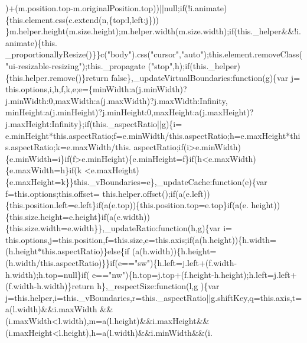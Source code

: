 \begin{DoxyCode}
      )+(m.position.top-m.originalPosition.top))||null;\textcolor{keywordflow}{if}(!i.animate)\{this.element.css(c.extend(n,\{top:l,left:j\}))
      \}m.helper.height(m.size.height);m.helper.width(m.size.width);\textcolor{keywordflow}{if}(this.\_helper&&!i.animate)\{this.
      \_proportionallyResize()\}\}c(\textcolor{stringliteral}{"body"}).css(\textcolor{stringliteral}{"cursor"},\textcolor{stringliteral}{"auto"});this.element.removeClass(\textcolor{stringliteral}{"ui-resizable-resizing"});this.\_propagate
      (\textcolor{stringliteral}{"stop"},h);\textcolor{keywordflow}{if}(this.\_helper)\{this.helper.remove()\}\textcolor{keywordflow}{return} \textcolor{keyword}{false}\},\_updateVirtualBoundaries:\textcolor{keyword}{function}(g)\{var j=
      this.options,i,h,f,k,e;e=\{minWidth:a(j.minWidth)?j.minWidth:0,maxWidth:a(j.maxWidth)?j.maxWidth:Infinity,
      minHeight:a(j.minHeight)?j.minHeight:0,maxHeight:a(j.maxHeight)?j.maxHeight:Infinity\};\textcolor{keywordflow}{if}(this.\_aspectRatio||g)\{i=
      e.minHeight*this.aspectRatio;f=e.minWidth/this.aspectRatio;h=e.maxHeight*this.aspectRatio;k=e.maxWidth/this.
      aspectRatio;\textcolor{keywordflow}{if}(i>e.minWidth)\{e.minWidth=i\}\textcolor{keywordflow}{if}(f>e.minHeight)\{e.minHeight=f\}\textcolor{keywordflow}{if}(h<e.maxWidth)\{e.maxWidth=h\}\textcolor{keywordflow}{if}(k
      <e.maxHeight)\{e.maxHeight=k\}\}this.\_vBoundaries=e\},\_updateCache:\textcolor{keyword}{function}(e)\{var f=this.options;this.offset=
      this.helper.offset();\textcolor{keywordflow}{if}(a(e.left))\{this.position.left=e.left\}\textcolor{keywordflow}{if}(a(e.top))\{this.position.top=e.top\}\textcolor{keywordflow}{if}(a(e.
      height))\{this.size.height=e.height\}\textcolor{keywordflow}{if}(a(e.width))\{this.size.width=e.width\}\},\_updateRatio:\textcolor{keyword}{function}(h,g)\{var i=
      this.options,j=this.position,f=this.size,e=this.axis;\textcolor{keywordflow}{if}(a(h.height))\{h.width=(h.height*this.aspectRatio)\}\textcolor{keywordflow}{else}\{\textcolor{keywordflow}{if}
      (a(h.width))\{h.height=(h.width/this.aspectRatio)\}\}\textcolor{keywordflow}{if}(e==\textcolor{stringliteral}{"sw"})\{h.left=j.left+(f.width-h.width);h.top=null\}\textcolor{keywordflow}{if}(
      e==\textcolor{stringliteral}{"nw"})\{h.top=j.top+(f.height-h.height);h.left=j.left+(f.width-h.width)\}\textcolor{keywordflow}{return} h\},\_respectSize:\textcolor{keyword}{function}(l,g
      )\{var j=this.helper,i=this.\_vBoundaries,r=this.\_aspectRatio||g.shiftKey,q=this.axis,t=a(l.width)&&i.maxWidth
      &&(i.maxWidth<l.width),m=a(l.height)&&i.maxHeight&&(i.maxHeight<l.height),h=a(l.width)&&i.minWidth&&(i.

\end{DoxyCode}
